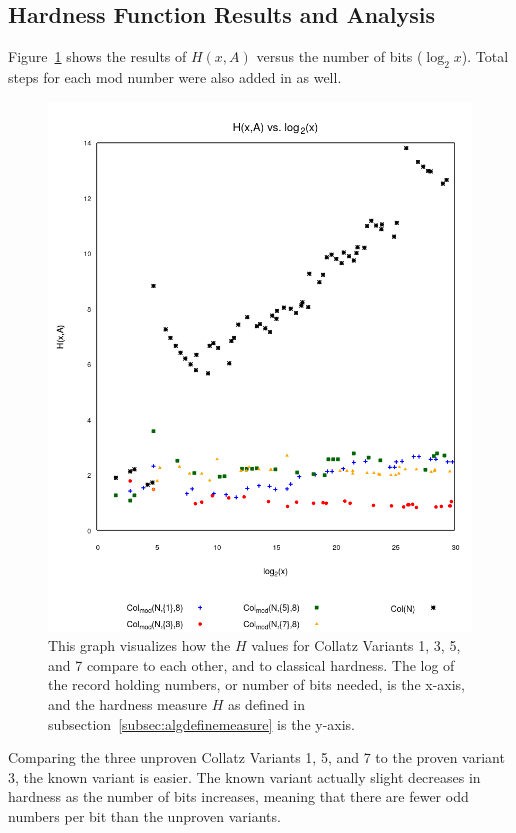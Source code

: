 \subsection{Hardness Function Results and Analysis} \label{subsubsec:algsinhardness}
Figure~\ref{fig:hvslog} shows the results of $H(x,A)$ versus the number of bits ($\log_2{x}$). Total steps for each mod number were also added in as well.\par
\begin{figure}
    \centering
    \includegraphics[scale=0.6]{ModAvoidanceAnalysisPics/H_vs_log.png}
    \caption{This graph visualizes how the $H$ values for Collatz Variants 1, 3, 5, and 7 compare to each other, and to classical hardness. The log of the record holding numbers, or number of bits needed, is the x-axis, and the hardness measure $H$ as defined in subsection~\ref{subsec:algdefinemeasure} is the y-axis.}
    \label{fig:hvslog}
\end{figure}
Comparing the three unproven Collatz Variants 1, 5, and 7 to the proven variant 3, the known variant is easier. The known variant actually slight decreases in hardness as the number of bits increases, meaning that there are fewer odd numbers per bit than the unproven variants. \par
